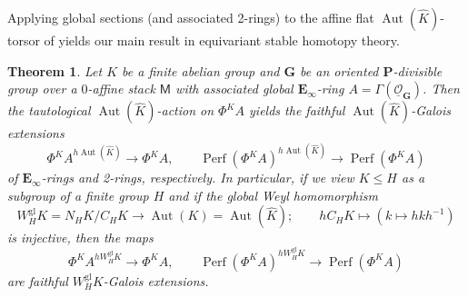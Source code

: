 \documentclass[11pt, a4paper]{article}
\newcommand{\gl}{\mathrm{gl}}
\newcommand{\1}{\mathbf{1}}
\DeclareMathOperator{\Perf}{Perf}
\DeclareMathOperator{\Aut}{Aut}
\newcommand{\ul}[1]{\underline{#1}}
\newcommand{\dual}[1]{{\widehat{#1}}}
\newcommand{\E}{\mathbf{E}}
\newcommand{\G}{\mathbf{G}}
\newcommand{\M}{\mathsf{M}}
\renewcommand{\O}{\mathcal{O}}
\renewcommand{\P}{\mathbf{P}}
\newcommand{\Ga}{\Gamma}
\theoremstyle{plain}
\newtheorem{theoremalph}{Theorem}
\theoremstyle{definition}
\theoremstyle{remark}\numberwithin{equation}{section}
\begin{document}
Applying global sections (and associated 2-rings) to the affine flat $\Aut(\dual{K})$-torsor of  yields our main result in equivariant stable homotopy theory.

\begin{theoremalph}\label{main_algebraic}
    Let $K$ be a finite abelian group and $\G$ be an oriented $\P$-divisible group over a $0$-affine stack $\M$ with associated global $\E_\infty$-ring $A=\Ga(\ul{\O}_\G)$. Then the tautological $\Aut(\dual{K})$-action on $\Phi^K A$ yields the faithful $\Aut(\dual{K})$-Galois extensions
    \[\Phi^K A^{h \Aut(\dual{K})} \to \Phi^K A, \qquad \Perf(\Phi^K A)^{h \Aut(\dual{K})} \to \Perf(\Phi^K A)\]
    of $\E_\infty$-rings and 2-rings, respectively. In particular, if we view $K\leq H$ as a subgroup of a finite group $H$ and if the global Weyl homomorphism
    \begin{equation}\label{eq:weyl_homomorphism} W^\gl_H K = N_H K / C_H K \to \Aut(K) = \Aut(\dual{K}); \qquad hC_H K \mapsto (k\mapsto hkh^{-1})\end{equation}
    is injective, then the maps
    \[\Phi^K A^{h W_H^\gl K} \to \Phi^K A, \qquad \Perf(\Phi^K A)^{h W_H^\gl K} \to \Perf(\Phi^K A)\]
    are faithful $W_H^\gl K$-Galois extensions.
\end{theoremalph}
\end{document}
